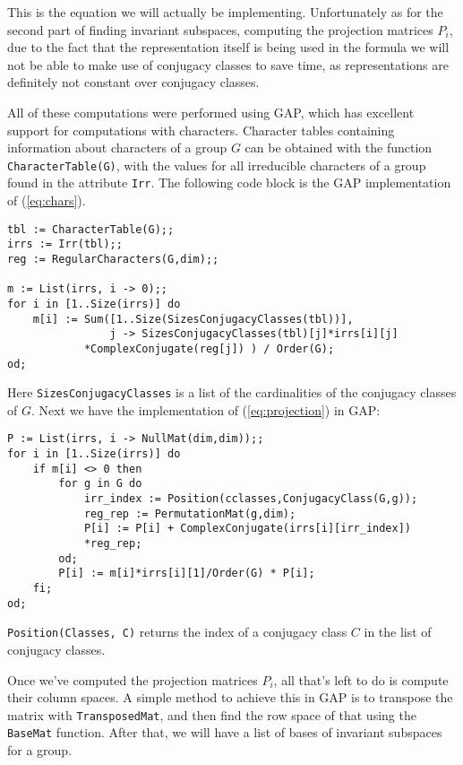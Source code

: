 \documentclass[11pt]{article} %
\theoremstyle{definition}
\theoremstyle{remark}
\newcommand{\code}[1]{\texttt{#1}}
\begin{document}
This is the equation we will actually be implementing. Unfortunately as for the second part of finding invariant subspaces, computing the projection matrices $P_i$, due to the fact that the representation itself is being used in the formula we will not be able to make use of conjugacy classes to save time, as representations are definitely not constant over conjugacy classes.

All of these computations were performed using GAP, which has excellent support for computations with characters. Character tables containing information about characters of a group $G$ can be obtained with the function \code{CharacterTable(G)}, with the values for all irreducible characters of a group found in the attribute \code{Irr}. The following code block is the GAP implementation of (\ref{eq:chars}).

\begin{lstlisting}[frame = single]
tbl := CharacterTable(G);;
irrs := Irr(tbl);;
reg := RegularCharacters(G,dim);;

m := List(irrs, i -> 0);;
for i in [1..Size(irrs)] do
    m[i] := Sum([1..Size(SizesConjugacyClasses(tbl))],
                j -> SizesConjugacyClasses(tbl)[j]*irrs[i][j]
		    *ComplexConjugate(reg[j]) ) / Order(G);
od;
\end{lstlisting}

Here \code{SizesConjugacyClasses} is a list of the cardinalities of the conjugacy classes of $G$. Next we have the implementation of (\ref{eq:projection}) in GAP:

\begin{lstlisting}[frame = single]
P := List(irrs, i -> NullMat(dim,dim));;
for i in [1..Size(irrs)] do
    if m[i] <> 0 then
        for g in G do
            irr_index := Position(cclasses,ConjugacyClass(G,g));
            reg_rep := PermutationMat(g,dim);
            P[i] := P[i] + ComplexConjugate(irrs[i][irr_index])
			*reg_rep;
        od;
        P[i] := m[i]*irrs[i][1]/Order(G) * P[i];
    fi;
od;
\end{lstlisting}

\code{Position(Classes, C)} returns the index of a conjugacy class $C$ in the list of conjugacy classes.

Once we've computed the projection matrices $P_i$, all that's left to do is compute their column spaces. A simple method to achieve this in GAP is to transpose the matrix with \code{TransposedMat}, and then find the row space of that using the \code{BaseMat} function. After that, we will have a list of bases of invariant subspaces for a group.
\end{document}
